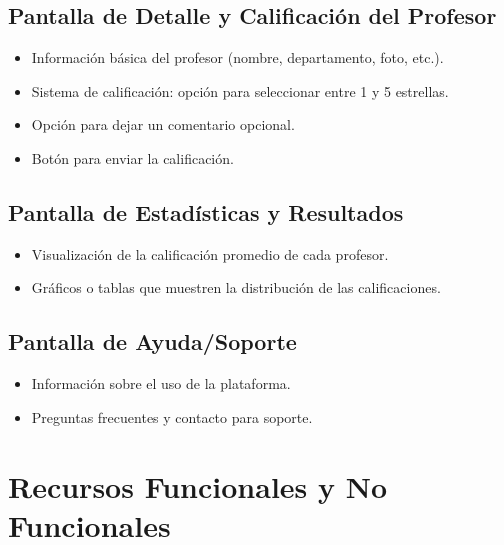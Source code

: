 \documentclass[11pt]{article}
\begin{document}
\subsection{Pantalla de Detalle y Calificación del Profesor}
\begin{itemize}
    \item Información básica del profesor (nombre, departamento, foto, etc.).
    \item Sistema de calificación: opción para seleccionar entre 1 y 5 estrellas.
    \item Opción para dejar un comentario opcional.
    \item Botón para enviar la calificación.
\end{itemize}

\subsection{Pantalla de Estadísticas y Resultados}
\begin{itemize}
    \item Visualización de la calificación promedio de cada profesor.
    \item Gráficos o tablas que muestren la distribución de las calificaciones.
\end{itemize}

\subsection{Pantalla de Ayuda/Soporte}
\begin{itemize}
    \item Información sobre el uso de la plataforma.
    \item Preguntas frecuentes y contacto para soporte.
\end{itemize}

\section{Recursos Funcionales y No Funcionales}
\end{document}
